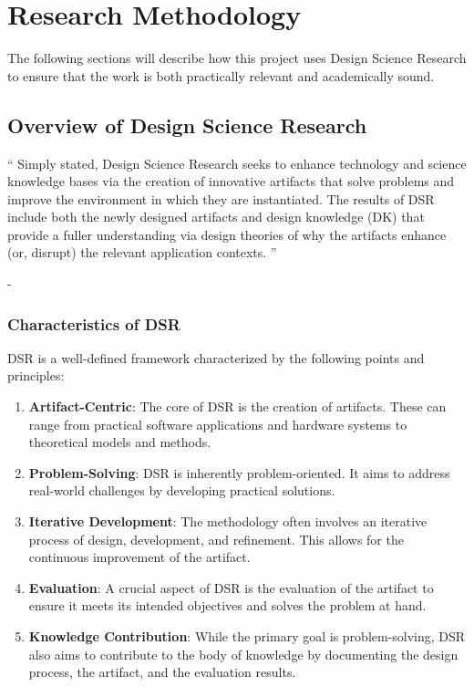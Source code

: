 \chapter{Research Methodology}

The following sections will describe how this project uses 
Design Science Research to ensure that the work is both practically 
relevant and academically sound.

\label{Chapter3}
\section{Overview of Design Science Research}

\enquote{
Simply stated, Design Science Research seeks to enhance
technology and science knowledge bases via the creation of innovative artifacts that solve
problems and improve the environment in which they are instantiated. The results of DSR include
both the newly designed artifacts and design knowledge (DK) that provide a fuller understanding
via design theories of why the artifacts enhance (or, disrupt) the relevant application contexts.
}  

  
- \cite{DesignScienceHevner}

\subsection{Characteristics of DSR}

DSR is a well-defined framework characterized by the following points and principles:

\begin{enumerate}
    \item \textbf{Artifact-Centric}: The core of DSR is the creation of artifacts. These can range from practical software applications and hardware systems to theoretical models and methods.
    \item \textbf{Problem-Solving}: DSR is inherently problem-oriented. It aims to address real-world challenges by developing practical solutions.
    \item \textbf{Iterative Development}: The methodology often involves an iterative process of design, development, and refinement. This allows for the continuous improvement of the artifact.
    \item \textbf{Evaluation}: A crucial aspect of DSR is the evaluation of the artifact to ensure it meets its intended objectives and solves the problem at hand.
    \item \textbf{Knowledge Contribution}: While the primary goal is problem-solving, DSR also aims to contribute to the body of knowledge by documenting the design process, the artifact, and the evaluation results.
\end{enumerate}

